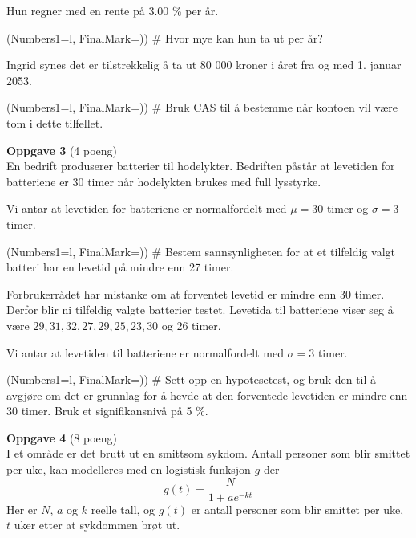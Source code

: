 Hun regner med en rente på 3.00 \% per år.
\begin{easylist}
	\ListProperties(Numbers1=l, FinalMark={)})
	# Hvor mye kan hun ta ut per år?
\end{easylist}
Ingrid synes det er tilstrekkelig å ta ut 80 000 kroner
i året fra og med 1. januar 2053.
\begin{easylist}
	\ListProperties(Numbers1=l, FinalMark={)})
	# Bruk CAS til å bestemme når kontoen 
	vil være tom i dette tilfellet.
\end{easylist}
\vfill
\clearpage
{\bfseries \large Oppgave 3} (4 poeng) \vspace*{1em} \\
En bedrift produserer batterier til hodelykter.
Bedriften påstår at levetiden for batteriene
er 30 timer når hodelykten brukes med full lysstyrke.

Vi antar at levetiden for batteriene er normalfordelt
med $\mu = 30$ timer og $\sigma = 3$ timer.
\begin{easylist}[enumerate]
	\ListProperties(Numbers1=l, FinalMark={)})
	# Bestem sannsynligheten for at et tilfeldig valgt
	batteri har en levetid på mindre enn 27 timer.
\end{easylist}

Forbrukerrådet har mistanke om at forventet levetid er mindre
enn 30 timer. Derfor blir ni tilfeldig valgte batterier testet.
Levetida til batteriene viser seg å være
$29, 31, 32, 27, 29, 25, 23, 30$ og $26$ timer.

Vi antar at levetiden til batteriene er normalfordelt med
$\sigma = 3$ timer.

\begin{easylist}
	\ListProperties(Numbers1=l, FinalMark={)})
	# Sett opp en hypotesetest, og bruk den til å avgjøre
	om det er grunnlag for å hevde at den forventede levetiden
	er mindre enn 30 timer. Bruk et signifikansnivå på 5 \%.
\end{easylist}
\vfill
\vspace*{2em}
{\bfseries \large Oppgave 4} (8 poeng) \vspace*{1em} \\
I et område er det brutt ut en smittsom sykdom.
Antall personer som blir smittet per uke,
kan modelleres med en logistisk funksjon $g$ der
\begin{equation*}
	g(t) = \frac{N}{1 + ae^{-kt}}
\end{equation*}
Her er $N$, $a$ og $k$ reelle tall, og $g(t)$ er antall personer
som blir smittet per uke, $t$ uker etter at sykdommen
brøt ut.

